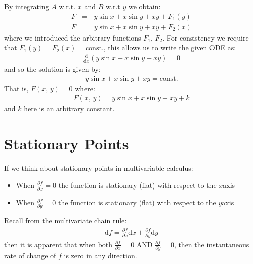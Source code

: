\documentclass[letterpaper,10pt,english]{jupyterBook}
\begin{document}
\sphinxAtStartPar
By integrating \(A\) w.r.t. \(x\) and \(B\) w.r.t \(y\) we obtain:
\begin{equation*}
\begin{split}F &=&\, y\sin{x} + x\sin{y} + xy + F_1(y)\\
F &=&\, y\sin{x} + x\sin{y} + xy + F_2(x)\end{split}
\end{equation*}
\sphinxAtStartPar
where we introduced the arbitrary functions \(F_1,\, F_2\).  For consistency we require that \(F_1(y) = F_2(x) = \mathrm{const.}\), this
allows us to write the given ODE as:
\begin{equation*}
\begin{split}\frac{\mathrm{d}}{\mathrm{d}x}\left(y\sin{x}+x\sin{y}+xy\right)=0\end{split}
\end{equation*}
\sphinxAtStartPar
and so the solution is given by:
\begin{equation*}
\begin{split}y\sin{x}+x\sin{y}+xy=\mathrm{const.}\end{split}
\end{equation*}
\sphinxAtStartPar
That is, \(F(x,\, y) = 0\) where:
\begin{equation*}
\begin{split}F(x,\, y) = y\sin{x} + x\sin{y} + xy + k\end{split}
\end{equation*}
\sphinxAtStartPar
and \(k\) here is an arbitrary constant.


\section{Stationary Points}
\label{\detokenize{VectorCalculus/partialdifferentiation:stationary-points}}
\sphinxAtStartPar
If we think about stationary points in multivariable calculus:
\begin{itemize}
\item {} 
\sphinxAtStartPar
When \(\frac{\partial f}{\partial x}=0\) the function is stationary (flat) with respect to the \(x\)\sphinxhyphen{}axis

\item {} 
\sphinxAtStartPar
When \(\frac{\partial f}{\partial y}=0\) the function is stationary (flat) with respect to the \(y\)\sphinxhyphen{}axis

\end{itemize}

\sphinxAtStartPar
Recall from the multivariate chain rule:
\begin{equation*}
\begin{split}\mathrm{d}f = \frac{\partial f}{\partial x}\mathrm{d}x+\frac{\partial f}{\partial y}\mathrm{d}y\end{split}
\end{equation*}
\sphinxAtStartPar
then it is apparent that when both \(\frac{\partial f}{\partial x}=0\) AND \(\frac{\partial f}{\partial y}=0\), then the instantaneous rate of change of
\(f\) is zero in any direction.
\end{document}
